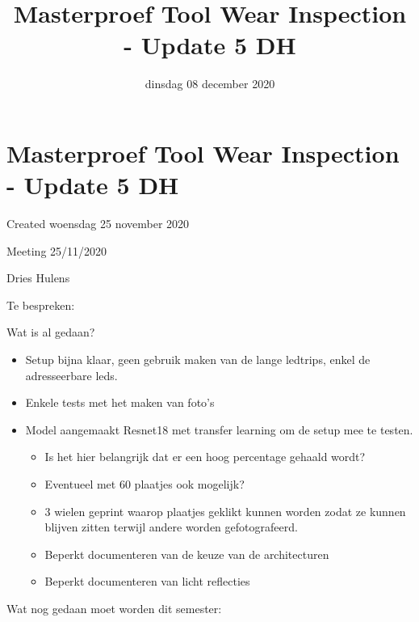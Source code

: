 \documentclass{scrartcl}
\title{Masterproef Tool Wear Inspection - Update 5 DH}
\date{dinsdag 08 december 2020}
\author{}
\begin{document}
\maketitle

		\section{Masterproef Tool Wear Inspection - Update 5 DH}

Created woensdag 25 november 2020



Meeting 25/11/2020

Dries Hulens



Te bespreken:



Wat is al gedaan?

\begin{itemize}
\item Setup bijna klaar, geen gebruik maken van de lange ledtrips, enkel de adresseerbare leds. 
\item Enkele tests met het maken van foto’s
\item Model aangemaakt Resnet18 met transfer learning om de setup mee te testen.
	\begin{itemize}
	\item Is het hier belangrijk dat er een hoog percentage gehaald wordt? 
	\item Eventueel met 60 plaatjes ook mogelijk?
	\item 3 wielen geprint waarop plaatjes geklikt kunnen worden zodat ze kunnen blijven zitten terwijl andere worden gefotografeerd.
	\item Beperkt documenteren van de keuze van de architecturen
	\item Beperkt documenteren van licht reflecties
	\end{itemize}
\end{itemize}


Wat nog gedaan moet worden dit semester:
\end{document}
